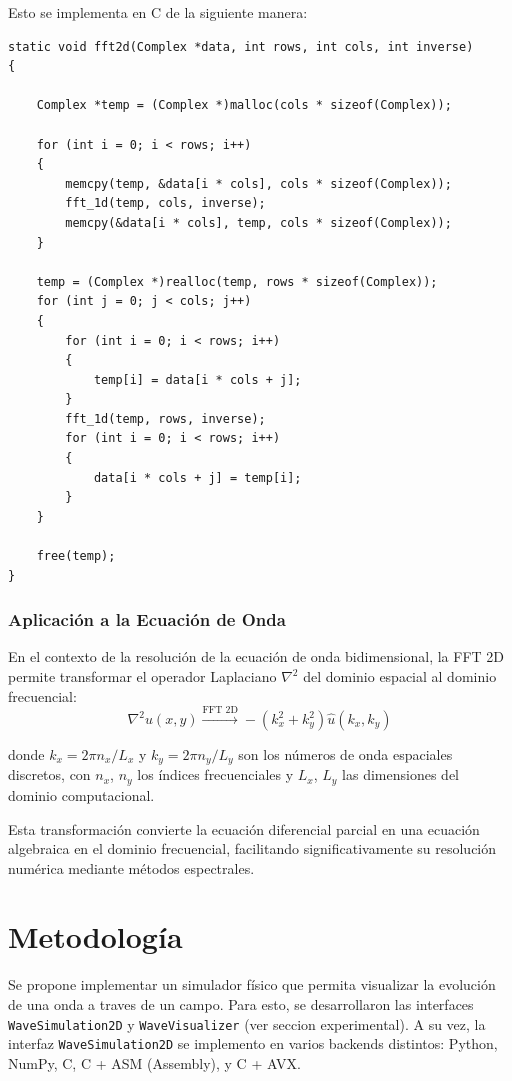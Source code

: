 \documentclass[a4paper]{article}
\begin{document}
Esto se implementa en C de la siguiente manera:
\begin{verbatim}
static void fft2d(Complex *data, int rows, int cols, int inverse)
{

    Complex *temp = (Complex *)malloc(cols * sizeof(Complex));

    for (int i = 0; i < rows; i++)
    {
        memcpy(temp, &data[i * cols], cols * sizeof(Complex));
        fft_1d(temp, cols, inverse);
        memcpy(&data[i * cols], temp, cols * sizeof(Complex));
    }

    temp = (Complex *)realloc(temp, rows * sizeof(Complex));
    for (int j = 0; j < cols; j++)
    {
        for (int i = 0; i < rows; i++)
        {
            temp[i] = data[i * cols + j];
        }
        fft_1d(temp, rows, inverse);
        for (int i = 0; i < rows; i++)
        {
            data[i * cols + j] = temp[i];
        }
    }

    free(temp);
}
\end{verbatim}

\subsubsection{Aplicación a la Ecuación de Onda}

En el contexto de la resolución de la ecuación de onda bidimensional, la FFT 2D permite transformar el operador Laplaciano $\nabla^2$ del dominio espacial al dominio frecuencial:
\begin{equation}
    \nabla^2 u(x,y) \xrightarrow{\text{FFT 2D}} -(k_x^2 + k_y^2) \hat{u}(k_x, k_y)
\end{equation}

donde $k_x = 2\pi n_x/L_x$ y $k_y = 2\pi n_y/L_y$ son los números de onda espaciales discretos, con $n_x$, $n_y$ los índices frecuenciales y $L_x$, $L_y$ las dimensiones del dominio computacional.

Esta transformación convierte la ecuación diferencial parcial en una ecuación algebraica en el dominio frecuencial, facilitando
significativamente su resolución numérica mediante métodos espectrales.

\section{Metodología}
Se propone implementar un simulador físico que permita visualizar la evolución de una onda a traves de un campo. Para esto, se desarrollaron
las interfaces \texttt{WaveSimulation2D} y \texttt{WaveVisualizer} (ver seccion experimental). A su vez, la interfaz \texttt{WaveSimulation2D} se implemento en varios
backends distintos: Python, NumPy, C, C + ASM (Assembly), y C + AVX.
\end{document}
